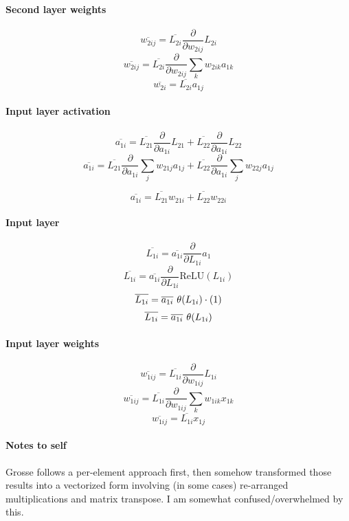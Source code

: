 \documentclass{article}
\begin{document}
\paragraph{Second layer weights}
\[\overline{w_{2ij}} = \overline{L_{2i}} \frac{\partial}{\partial{w_{2ij}}} L_{2i} \]
\[\overline{w_{2ij}} = \overline{L_{2i}} \frac{\partial}{\partial{w_{2ij}}} \sum_{k} w_{2ik}a_{1k} \]
\begin{equation}
    \overline{w_{2i}} = \overline{L_{2i}} a_{1j}
\end{equation}
\paragraph{Input layer activation}
\[\overline{a_{1i}} = \overline{L_{21}} \frac{\partial}{\partial{a_{1i}}} L_{21} + \overline{L_{22}} \frac{\partial}{\partial{a_{1i}}} L_{22}\]
\[\overline{a_{1i}} = \overline{L_{21}} \frac{\partial}{\partial{a_{1i}}} \sum_{j} w_{21j}a_{1j} + \overline{L_{22}} \frac{\partial}{\partial{a_{1i}}} \sum_{j} w_{22j}a_{1j}\]

\begin{equation}
\overline{a_{1i}} = \overline{L_{21}} w_{21i} + \overline{L_{22}} w_{22i}
\end{equation}
\paragraph{Input layer}
\[\overline{L_{1i}} = \overline{a_{1i}} \frac{\partial}{\partial{L_{1i}}} a_1\]
\[\overline{L_{1i}} = \overline{a_{1i}} \frac{\partial}{\partial{L_{1i}}} \text{ReLU}(L_{1i})\]
\[\overline{L_{1i}} = \overline{a_{1i}} \hspace{0.125cm} \theta(L_{1i}) \cdot (1)\]
\begin{equation}
    \overline{L_{1i}} = \overline{a_{1i}} \hspace{0.125cm} \theta(L_{1i})
\end{equation}
\paragraph{Input layer weights}
\[\overline{w_{1ij}} = \overline{L_{1i}} \frac{\partial}{\partial{w_{1ij}}} L_{1i}\]
\[\overline{w_{1ij}} = \overline{L_{1i}} \frac{\partial}{\partial{w_{1ij}}} \sum_{k} w_{1ik}x_{1k}\]
\begin{equation}
    \overline{w_{1ij}} = \overline{L_{1i}} x_{1j}
\end{equation}

\paragraph{Notes to self} Grosse follows a per-element approach first, then somehow transformed
those results into a vectorized form involving (in some cases) re-arranged 
multiplications and matrix transpose. I am somewhat confused/overwhelmed by this. 
\end{document}
